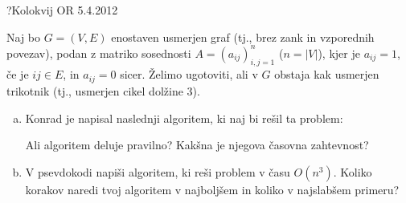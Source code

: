 \begin{naloga}{?}{Kolokvij OR 5.4.2012}
\begin{vprasanje}
Naj bo $G = (V, E)$ enostaven usmerjen graf
(tj., brez zank in vzporednih povezav),
podan z matriko sosednosti $A = (a_{ij})_{i,j=1}^n$ ($n = |V|$),
kjer je $a_{ij} = 1$, če je $ij \in E$, in $a_{ij} = 0$ sicer.
Želimo ugotoviti, ali v $G$ obstaja kak usmerjen trikotnik
(tj., usmerjen cikel dolžine $3$).
\begin{enumerate}[(a)]
\item Konrad je napisal naslednji algoritem, ki naj bi rešil ta problem:
\begin{small}
\begin{algorithmic}
                    \State {}
                \EndIf
            \EndFor
        \EndFor
    \EndFor
\EndFor
\State {}
\end{algorithmic}
\end{small}
Ali algoritem deluje pravilno?
Kakšna je njegova časovna zahtevnost?

\item V psevdokodi napiši algoritem, ki reši problem v času $O(n^3)$.
Koliko korakov naredi tvoj algoritem v najboljšem
in koliko v najslabšem primeru?
\end{enumerate}
\end{vprasanje}
\begin{odgovor}
\end{odgovor}
\end{naloga}
